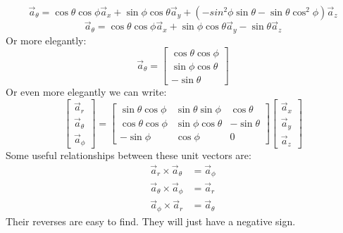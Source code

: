             $$
                \vec{a}_\theta = \cos\theta\cos\phi\vec{a}_x
                + \sin\phi\cos\theta\vec{a}_y
                + \left(-sin^2\phi\sin\theta - \sin\theta\cos^2\phi\right)\vec{a}_z
            $$
            $$
                \vec{a}_\theta = \cos\theta\cos\phi\vec{a}_x
                + \sin\phi\cos\theta\vec{a}_y
                - \sin\theta\vec{a}_z
            $$
            Or more elegantly:
            $$\vec{a}_\theta = 
                \begin{bmatrix}
                    \cos\theta\cos\phi \\
                    \sin\phi\cos\theta \\
                    -\sin\theta
                \end{bmatrix}
            $$
            Or even more elegantly we can write:
            \begin{equation}
                \begin{bmatrix}
                    \vec{a}_r \\
                    \vec{a}_\theta \\
                    \vec{a}_\phi 
                \end{bmatrix} 
                =
                \begin{bmatrix}
                    \sin\theta\cos\phi & \sin\theta\sin\phi & \cos\theta \\
                    \cos\theta\cos\phi & \sin\phi\cos\theta & -\sin\theta \\
                    -\sin\phi & \cos\phi & 0
                \end{bmatrix}
                \begin{bmatrix}
                    \vec{a}_x \\
                    \vec{a}_y \\
                    \vec{a}_z 
                \end{bmatrix}
            \end{equation}
            Some useful relationships between these unit vectors are:
            \begin{align}
                \vec{a}_r \times \vec{a}_\theta & = \vec{a}_\phi \\
                \vec{a}_\theta \times \vec{a}_\phi & = \vec{a}_r \\
                \vec{a}_\phi \times \vec{a}_r & = \vec{a}_\theta 
            \end{align}
            Their reverses are easy to find. They will just have a negative sign.
